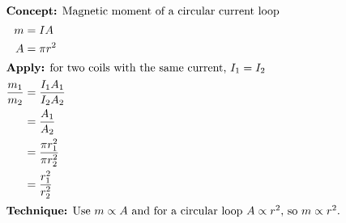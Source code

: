 \begin{idea}
    \begin{align*}
    \intertext{\textbf{Concept:} Magnetic moment of a circular current loop}
    m &= IA \\
    A &= \pi r^2 \\
    \intertext{\textbf{Apply:} for two coils with the same current, $I_1=I_2$}
    \frac{m_1}{m_2} &= \frac{I_1A_1}{I_2A_2} \\
    &= \frac{A_1}{A_2} \\
    &= \frac{\pi r_1^2}{\pi r_2^2} \\
    &= \frac{r_1^2}{r_2^2} \\
    \intertext{\textbf{Technique:} Use $m \propto A$ and for a circular loop $A \propto r^2$, so $m \propto r^2$.}
    \end{align*}
\end{idea}
